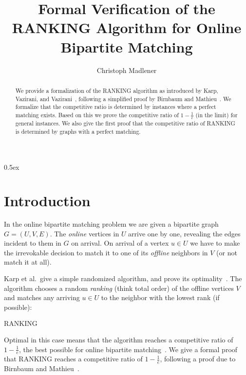 \documentclass[11pt,a4paper]{article}
\begin{document}
\title{Formal Verification of the RANKING Algorithm for Online Bipartite Matching}
\author{Christoph Madlener}
\maketitle

\begin{abstract}
We provide a formalization of the RANKING algorithm as introduced by Karp, Vazirani, and
Vazirani~\cite{karp1990}, following a simplified proof by Birnbaum and Mathieu~\cite{birnbaum2008}.
We formalize that the competitive ratio is determined by instances
where a perfect matching exists. Based on this we prove the competitive ratio of $1 - \frac{1}{e}$
(in the limit) for general instances. We also give the first proof that the competitive ratio
of RANKING is determined by graphs with a perfect matching.
\end{abstract}

\tableofcontents

\parindent 0pt\parskip 0.5ex

\section{Introduction}
In the online bipartite matching problem we are given a bipartite graph $G=(U,V,E)$. The \emph{online}
vertices in $U$ arrive one by one, revealing the edges incident to them in $G$ on arrival. On
arrival of a vertex $u \in U$ we have to make the irrevokable decision to match it to one of
its \emph{offline} neighbors in $V$ (or not match it at all).

Karp et al.\ give a simple randomized algorithm, and prove its optimality~\cite{karp1990}. The
algorithm chooses a random \emph{ranking} (think total order) of the offline vertices $V$ and
matches any arriving $u \in U$ to the neighbor with the lowest rank (if possible):

\begin{algorithm}[H]
\DontPrintSemicolon
\caption{RANKING}\label{alg:ranking}
\Online{}
\end{algorithm}

Optimal in this case means that the algorithm reaches a competitive ratio of $1 - \frac{1}{e}$,
the best possible for online bipartite matching~\cite{karp1990}.
We give a formal proof that RANKING reaches a competitive ratio of $1-\frac{1}{e}$,
 following a proof due to Birnbaum and Mathieu~\cite{birnbaum2008}.
\end{document}
